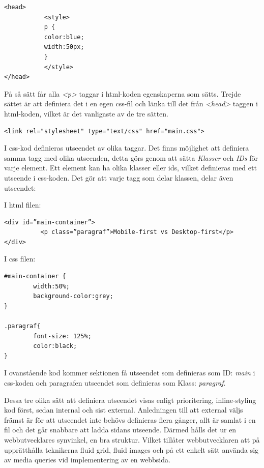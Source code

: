 \documentclass[11pt]{article}
\begin{document}
\vspace{0.5cm}
\begin{verbatim}
<head>
           <style>
           p {
           color:blue;
           width:50px;
           }
           </style>
</head>
\end{verbatim}
\vspace{0.5cm}

På så sätt får alla \textit{<p>} taggar i html-koden egenskaperna som sätts. Trejde sättet är att definiera det i en egen css-fil och länka till det från \textit{<head>} taggen i html-koden, vilket är det vanligaste av de tre sätten. 
\vspace{0.3cm}
\begin{verbatim}
<link rel="stylesheet" type="text/css" href="main.css">
\end{verbatim}
\vspace{0.5cm}

I css-kod definieras utseendet av olika taggar. Det finns möjlighet att definiera samma tagg med olika utseenden, detta görs genom att sätta \textit{Klasser} och \textit{IDs} för varje element. Ett element kan ha olika klasser eller ids, vilket definieras med ett utseende i css-koden. Det gör att varje tagg som delar klassen, delar även utseendet:

\vspace{0.3cm}
I html filen:

\begin{verbatim}
<div id=”main-container”>
          <p class=”paragraf”>Mobile-first vs Desktop-first</p>
</div>
\end{verbatim}
\vspace{0.5cm}
I css filen:

\begin{verbatim}
#main-container {
        width:50%;
        background-color:grey;
}

.paragraf{
        font-size: 125%;
        color:black;
}
\end{verbatim}
\vspace{1cm}

I ovanstående kod kommer sektionen få utseendet som definieras som ID: \textit{main} i css-koden och paragrafen utseendet som definieras som Klass: \textit{paragraf}.


Dessa tre olika sätt att definiera utseendet visas enligt prioritering, inline-styling kod först, sedan internal och sist external. Anledningen till att external väljs främst är för att utseendet inte behövs definieras flera gånger, allt är samlat i en fil och det går snabbare att ladda sidans utseende. Därmed hålls det ur en webbutvecklares synvinkel, en bra struktur. Vilket tillåter webbutvecklaren att på upprätthålla teknikerna fluid grid, fluid images och på ett enkelt sätt använda sig av media queries vid implementering av en webbsida.
\end{document}
